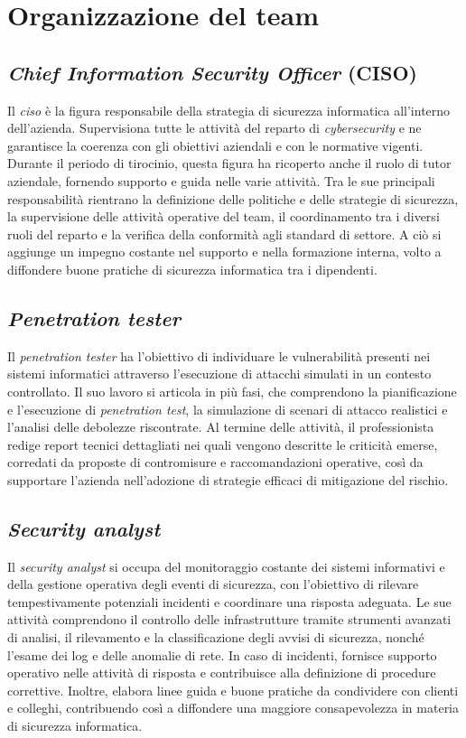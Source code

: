 \section{Organizzazione del team}  

\subsection{\textit{Chief Information Security Officer} (CISO)}  
Il \textit{\gls{ciso}} è la figura responsabile della strategia di sicurezza informatica all'interno dell'azienda.
Supervisiona tutte le attività del reparto di \textit{cybersecurity} e ne garantisce la coerenza con gli obiettivi aziendali e con le normative vigenti.
Durante il periodo di tirocinio, questa figura ha ricoperto anche il ruolo di tutor aziendale, fornendo supporto e guida nelle varie attività.
Tra le sue principali responsabilità rientrano la definizione delle politiche e delle strategie di sicurezza, la supervisione delle attività operative del team, il coordinamento tra i diversi ruoli del reparto e la verifica della conformità agli standard di settore.
A ciò si aggiunge un impegno costante nel supporto e nella formazione interna, volto a diffondere buone pratiche di sicurezza informatica tra i dipendenti.  

\subsection{\textit{Penetration tester}}  
Il \textit{penetration tester} ha l'obiettivo di individuare le vulnerabilità presenti nei sistemi informatici attraverso l'esecuzione di attacchi simulati in un contesto controllato.
Il suo lavoro si articola in più fasi, che comprendono la pianificazione e l'esecuzione di \textit{penetration test}, la simulazione di scenari di attacco realistici e l'analisi delle debolezze riscontrate.
Al termine delle attività, il professionista redige report tecnici dettagliati nei quali vengono descritte le criticità emerse, corredati da proposte di contromisure e raccomandazioni operative, così da supportare l'azienda nell'adozione di strategie efficaci di mitigazione del rischio.  

\subsection{\textit{Security analyst}}  
Il \textit{security analyst} si occupa del monitoraggio costante dei sistemi informativi e della gestione operativa degli eventi di sicurezza, con l'obiettivo di rilevare tempestivamente potenziali incidenti e coordinare una risposta adeguata.
Le sue attività comprendono il controllo delle infrastrutture tramite strumenti avanzati di analisi, il rilevamento e la classificazione degli avvisi di sicurezza, nonché l'esame dei log e delle anomalie di rete.
In caso di incidenti, fornisce supporto operativo nelle attività di risposta e contribuisce alla definizione di procedure correttive.
Inoltre, elabora linee guida e buone pratiche da condividere con clienti e colleghi, contribuendo così a diffondere una maggiore consapevolezza in materia di sicurezza informatica.  

